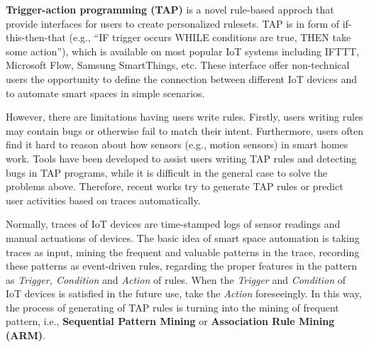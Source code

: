 \documentclass[sigplan, screen]{acmart}
\begin{document}
\textbf{Trigger-action programming (TAP)}\cite{ghiani2017personalization, huang2015supporting, ur2014practical} is a novel rule-based approch 
that provide interfaces for users to create personalized rulesets. TAP is in form of if-this-then-that (e.g., “IF trigger occurs WHILE conditions are true, THEN take
 some action”), which is available on most popular IoT systems including IFTTT\cite{IFTTT}, Microsoft Flow\cite{levy2017microsoft},
  Samsung SmartThings\cite{mossberg2014smartthings}, etc. These interface offer non-technical users the opportunity to define the connection between different IoT 
  devices and to automate smart spaces in simple scenarios. 

However, there are limitations having users write rules. Firstly, users writing rules may contain bugs or otherwise fail to match their intent\cite{mikolov2016roadmap, antonakakis2017understanding}.
Furthermore, users often find it hard to reason about how sensors (e.g., motion sensors) in smart homes work. Tools have been developed to assist users writing TAP rules and 
detecting bugs in TAP programs\cite{luo2020arbee, lien2016soli}, while it is difficult in the general case to solve the problems above. Therefore,
recent works try to generate TAP rules or predict user activities based on traces automatically.

Normally, traces of IoT devices are time-stamped logs of sensor readings and manual actuations of devices. The basic idea of smart space automation 
is taking traces as input, mining the frequent and valuable patterns in the trace, recording these patterns as event-driven rules, regarding the proper features
in the pattern as \emph{Trigger, Condition} and \emph{Action} of rules. When the \emph{Trigger} and \emph{Condition} of 
IoT devices is satisfied in the future use, take the \emph{Action} foreseeingly. In this way, the process of generating of TAP rules
is turning into the mining of frequent pattern, i.e., \textbf{Sequential Pattern Mining} or \textbf{Association Rule Mining (ARM)}.
\end{document}
